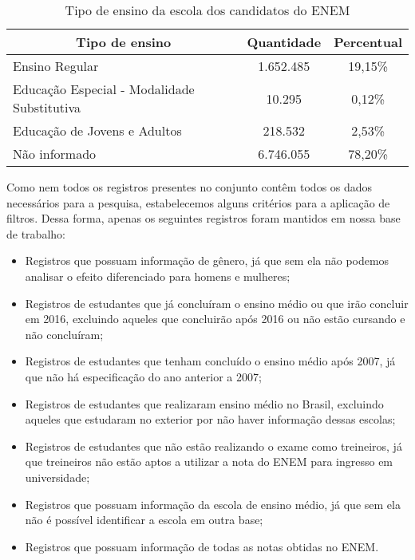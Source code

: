     \begin{table}[h]
      \begin{tabular}{lcc}
      \hline
      \multicolumn{1}{c}{\textbf{Tipo de ensino}} & \multicolumn{1}{c}{\textbf{Quantidade}} & \multicolumn{1}{c}{\textbf{Percentual}} \\ \hline
      Ensino Regular                              & 1.652.485                                 & 19,15\%                                 \\ \hline
      Educação Especial - Modalidade Substitutiva & 10.295                                   & 0,12\%                                  \\ \hline
      Educação de Jovens e Adultos                & 218.532                                  & 2,53\%                                  \\ \hline
      Não informado                & 6.746.055                                  & 78,20\%                                  \\ \hline
      \end{tabular}
      \caption{Tipo de ensino da escola dos candidatos do ENEM}
      \label{tab:tipo-ensino}
      \end{table}

Como nem todos os registros presentes no conjunto contêm todos os dados necessários para a pesquisa, estabelecemos alguns critérios para a aplicação de filtros. Dessa forma, apenas os seguintes registros foram mantidos em nossa base de trabalho:
\begin{itemize}
  \item Registros que possuam informação de gênero, já que sem ela não podemos analisar o efeito diferenciado para homens e mulheres;
  \item Registros de estudantes que já concluíram o ensino médio ou que irão concluir em 2016, excluindo aqueles que concluirão após 2016 ou não estão cursando e não concluíram; 
  \item Registros de estudantes que tenham concluído o ensino médio após 2007, já que não há especificação do ano anterior a 2007;
  \item Registros de estudantes que realizaram ensino médio no Brasil, excluindo aqueles que estudaram no exterior por não haver informação dessas escolas;
  \item Registros de estudantes que não estão realizando o exame como treineiros, já que treineiros não estão aptos a utilizar a nota do ENEM para ingresso em universidade;
  \item Registros que possuam informação da escola de ensino médio, já que sem ela não é possível identificar a escola em outra base;
  \item Registros que possuam informação de todas as notas obtidas no ENEM.
\end{itemize}

